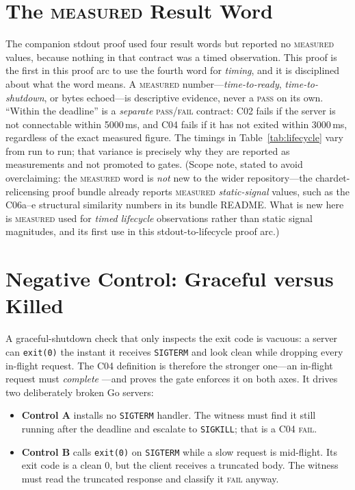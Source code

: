 \documentclass[11pt,letterpaper]{article}
\newcommand{\measured}{\textsc{measured}}
\begin{document}
\section{The \measured{} Result Word}
\label{sec:measured}

The companion stdout proof used four result words but reported no
\measured{} values, because nothing in that contract was a timed
observation. This proof is the first in this proof arc to use the fourth
word for \emph{timing}, and it is disciplined about what the word means. A
\measured{} number---\emph{time-to-ready}, \emph{time-to-shutdown}, or
bytes echoed---is descriptive evidence, never a \textsc{pass} on its
own. ``Within the deadline'' is a \emph{separate} \textsc{pass}/\textsc{fail}
contract: C02 fails if the server is not connectable within 5000\,ms,
and C04 fails if it has not exited within 3000\,ms, regardless of the
exact measured figure. The timings in Table~\ref{tab:lifecycle} vary
from run to run; that variance is precisely why they are reported as
measurements and not promoted to gates. (Scope note, stated to avoid
overclaiming: the \measured{} word is \emph{not} new to the wider
repository---the chardet-relicensing proof bundle already reports
\measured{} \emph{static-signal} values, such as the C06a--e structural
similarity numbers in its bundle README. What is new here is \measured{}
used for \emph{timed lifecycle} observations rather than static signal
magnitudes, and its first use in this stdout-to-lifecycle proof arc.)

\section{Negative Control: Graceful versus Killed}
\label{sec:control}

A graceful-shutdown check that only inspects the exit code is vacuous: a
server can \texttt{exit(0)} the instant it receives \texttt{SIGTERM} and
look clean while dropping every in-flight request. The C04 definition is
therefore the stronger one---an in-flight request must \emph{complete}
---and  proves the gate enforces it on
both axes. It drives two deliberately broken Go servers:

\begin{itemize}
  \item \textbf{Control A} installs no \texttt{SIGTERM} handler. The
        witness must find it still running after the deadline and
        escalate to \texttt{SIGKILL}; that is a C04 \textsc{fail}.
  \item \textbf{Control B} calls \texttt{exit(0)} on \texttt{SIGTERM}
        while a slow request is mid-flight. Its exit code is a clean 0,
        but the client receives a truncated body. The witness must read
        the truncated response and classify it \textsc{fail} anyway.
\end{itemize}
\end{document}
